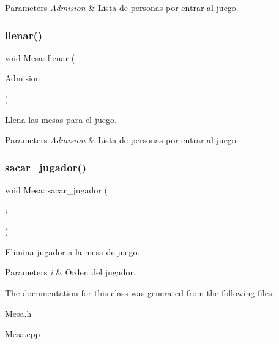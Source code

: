 \begin{DoxyParams}{Parameters}
{\em Admision} & \hyperlink{class_lista}{Lista} de personas por entrar al juego. \\
\hline
\end{DoxyParams}
\hypertarget{class_mesa_a1aafcc25c473a282495a4c7043fb42de}{}\label{class_mesa_a1aafcc25c473a282495a4c7043fb42de} 
\subsubsection{\texorpdfstring{llenar()}{llenar()}}
{\ttfamily void Mesa\+::llenar (\begin{DoxyParamCaption}\item[{\hyperlink{class_lista_con_arreglo}{Lista\+Con\+Arreglo}$<$ char $>$ $\ast$}]{Admision }\end{DoxyParamCaption})}



Llena las mesas para el juego. 


\begin{DoxyParams}{Parameters}
{\em Admision} & \hyperlink{class_lista}{Lista} de personas por entrar al juego. \\
\hline
\end{DoxyParams}
\hypertarget{class_mesa_a6b366909106ac813211e0e36703dc1b1}{}\label{class_mesa_a6b366909106ac813211e0e36703dc1b1} 
\subsubsection{\texorpdfstring{sacar\+\_\+jugador()}{sacar\_jugador()}}
{\ttfamily void Mesa\+::sacar\+\_\+jugador (\begin{DoxyParamCaption}\item[{int}]{i }\end{DoxyParamCaption})}



Elimina jugador a la mesa de juego. 


\begin{DoxyParams}{Parameters}
{\em i} & Orden del jugador. \\
\hline
\end{DoxyParams}


The documentation for this class was generated from the following files\+:\begin{DoxyCompactItemize}
\item 
Mesa.\+h\item 
Mesa.\+cpp\end{DoxyCompactItemize}
